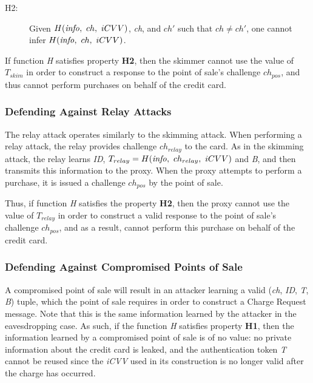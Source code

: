 \begin{description}
\item[H2:] Given $H(\textrm{\emph{info}},~ ch,~ iCVV)$, \emph{ch}, and $ch'$ such that $ch \neq ch'$, one cannot infer $H(\textrm{\emph{info}},~ ch,~ iCVV)$.
\end{description}

If function \emph{H} satisfies property \textbf{H2}, then the skimmer cannot use the value of $T_{skim}$ in order to construct a response to the point of sale's challenge $ch_{pos}$, and thus cannot perform purchases on behalf of the credit card.






\subsubsection*{Defending Against Relay Attacks}
The relay attack operates similarly to the skimming attack.
When performing a relay attack, the relay provides challenge $ch_{relay}$ to the card.
As in the skimming attack, the relay learns \emph{ID}, $T_{relay} = H(\textrm{\emph{info}},~ ch_{relay},~ iCVV)$ and \emph{B}, and then transmits this information to the proxy.
When the proxy attempts to perform a purchase, it is issued a challenge $ch_{pos}$ by the point of sale.

Thus, if function \emph{H} satisfies the property \textbf{H2},
	then the proxy cannot use the value of $T_{relay}$ in order to construct a valid response to the point of sale's challenge $ch_{pos}$,
	and as a result, cannot perform this purchase on behalf of the credit card.






\subsubsection*{Defending Against Compromised Points of Sale}
A compromised point of sale will result in an attacker learning a valid (\emph{ch}, \emph{ID}, \emph{T}, \emph{B}) tuple,
	which the point of sale requires in order to construct a Charge Request message.
Note that this is the same information learned by the attacker in the eavesdropping case.
As such, if the function \emph{H} satisfies property \textbf{H1}, then the information learned by a compromised point of sale is of no value:
	no private information about the credit card is leaked,
	and the authentication token \emph{T} cannot be reused since the \emph{iCVV} used in its construction is no longer valid after the charge has occurred.



